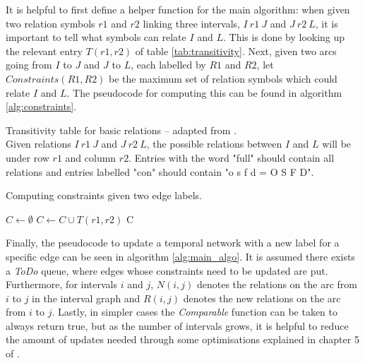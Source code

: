 \documentclass[../main.tex]{subfiles}
\begin{document}
It is helpful to first define a helper function for the main algorithm: when given two relation
symbols $r1$ and $r2$ linking three intervals, $I\ r1\ J$ and $J\ r2\ L$, it is important to tell
what symbols can relate $I$ and $L$. This is done by looking up the relevant entry $T(r1,r2)$ of
table \ref{tab:transitivity}. Next, given two arcs going from $I$ to $J$ and $J$ to $L$, each 
labelled by $R1$ and $R2$, let $\textit{Constraints}(R1,R2)$ be the maximum set of relation
symbols which could relate $I$ and $L$. The pseudocode for computing this can be found in
algorithm \ref{alg:constraints}.

\begin{table}[htpb]
  \centering
  
  \caption{Transitivity table for basic relations -- adapted from \cite{thomaswebsite}.\\
  Given relations $I\ r1\ J$ and $J\ r2\ L$,
  the possible relations between $I$ and $L$ will be under row $r1$ and column $r2$. Entries
  with the word "full" should contain all relations and entries labelled "con" should contain
  "o s f d = O S F D".}
  \label{tab:transitivity}
\end{table}

\begin{algorithm}
  \caption{Computing constraints given two edge labels. \cite{allen83}}\label{alg:constraints}
  \begin{algorithmic}
    \State $C \gets \emptyset$
        \State $C \gets C \cup T(r1,r2)$
      \EndFor
    \EndFor
    \State \Return C
    \EndFunction
  \end{algorithmic}
\end{algorithm}

Finally, the pseudocode to update a temporal network with a new label for a specific edge can be
seen in algorithm \ref{alg:main_algo}. It is assumed there exists a \textit{ToDo} queue,
where edges whose constraints need to be updated are put. Furthermore, for
intervals $i$ and $j$, $N(i,j)$ denotes the relations on the arc from $i$ to $j$ in the interval
graph and $R(i,j)$ denotes the new relations on the arc from $i$ to $j$. Lastly, in simpler cases
the \textit{Comparable} function can be taken to always return true, but as the number of
intervals grows, it is helpful to reduce the amount of updates needed through some optimisations
explained in chapter 5 of \cite{allen83}.
\end{document}
